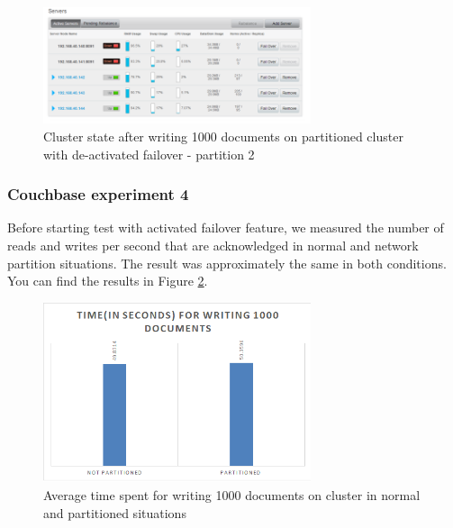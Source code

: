 \documentclass[a4paper]{article}
\begin{document}
\begin{figure}[h!]
	\centering
	\includegraphics[width=0.7\textwidth]{diagram4}
	\caption{Cluster state after writing 1000 documents on partitioned cluster with de-activated failover - partition 2}
	\label{fig:diagram4}
\end{figure}

\subsubsection{Couchbase experiment 4} 
Before starting test with activated failover feature, we measured the number of reads and writes per second that are acknowledged in normal and network partition situations.
The result was approximately the same in both conditions.
You can find the results in Figure \ref{fig:diagram5}.
\begin{figure}[h!]
	\centering
	\includegraphics[width=0.7\textwidth]{diagram5}
	\caption{Average time spent for writing 1000 documents on cluster in normal and partitioned situations}
	\label{fig:diagram5}
\end{figure}
\end{document}
